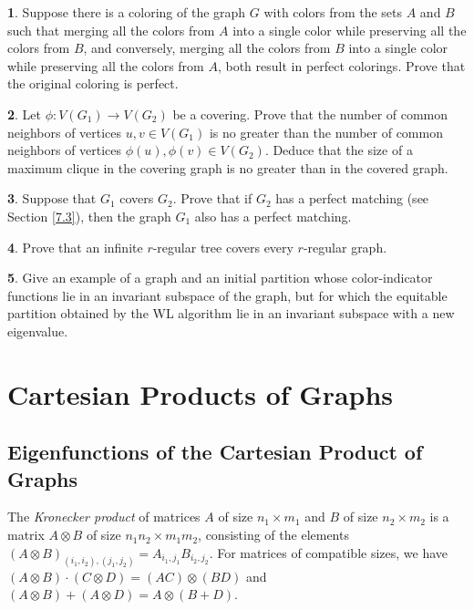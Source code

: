 \documentclass[11pt]{article}
\theoremstyle{definition}
\newtheorem{exercise}{\quad}
\begin{document}
\begin{exercise}
Suppose there is a coloring of the graph $G$ with colors from the sets $A$ and
$B$ such that merging all the colors from $A$ into a single color while preserving
all the colors from $B$, and conversely, merging all the colors from
$B$ into a single color while preserving all the colors from $A$, both result in perfect
colorings. Prove that the original coloring is perfect.
\end{exercise}


\begin{exercise}
Let $\phi: V(G_1)\rightarrow V(G_2)$ be a covering. Prove that
the number of common neighbors of vertices $u,v\in V(G_1)$ is no greater than the number
of common neighbors of vertices $\phi(u),\phi(v)\in V(G_2)$. Deduce that
the size of a maximum clique in the covering graph is no greater than in
the covered graph.
\end{exercise}

\begin{exercise}
Suppose that $G_1$ covers $G_2$. Prove that if
$G_2$ has a perfect matching (see Section \ref{7.3}),
then the graph $G_1$ also has a perfect matching.
\end{exercise}

\begin{exercise}
Prove that an infinite $r$-regular tree  covers every
$r$-regular graph. \end{exercise}

\begin{exercise}
Give an example of a graph and an initial partition whose color-indicator functions  
lie in an   invariant subspace of the graph, but for which the equitable partition obtained by the WL algorithm lie in an invariant subspace with a new eigenvalue.
\end{exercise}





\section{Cartesian Products of Graphs}\label{Cart}

\subsection{Eigenfunctions of the Cartesian Product of Graphs}

The {\sl Kronecker product} of matrices $A$ of size
$n_1\times m_1$ and  $B$ of size $n_2\times m_2$ is a matrix
$A\otimes B$ of size $n_1n_2\times m_1m_2$, consisting of the elements\\
$(A\otimes B)_{(i_1, i_2),(j_1, j_2)}=A_{i_1,j_1}B_{i_2,j_2}$.
For  matrices of compatible  sizes, we have  $(A\otimes
B)\cdot (C\otimes D)=(AC)\otimes(BD)$ and $(A\otimes B)+(A\otimes
D)=A\otimes (B+D)$.
\end{document}

